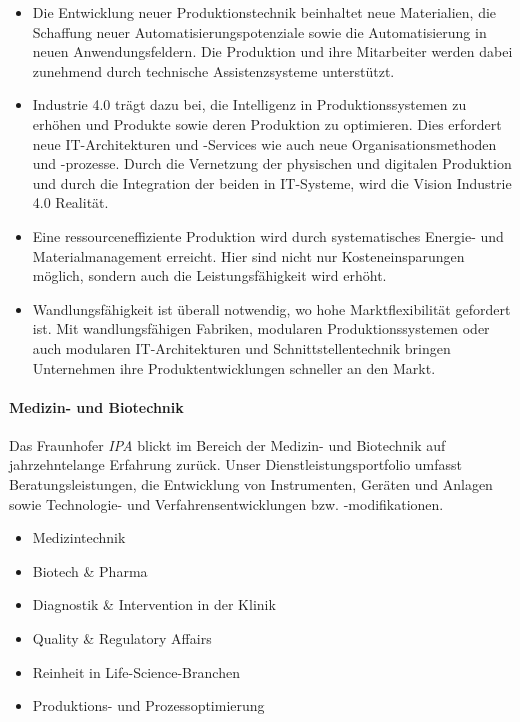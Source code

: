 \begin{itemize}
    \item Die Entwicklung neuer Produktionstechnik beinhaltet neue Materialien, die Schaffung neuer Automatisierungspotenziale sowie die Automatisierung in neuen Anwendungsfeldern.
      Die Produktion und ihre Mitarbeiter werden dabei zunehmend durch technische Assistenzsysteme unterstützt.
    \item Industrie 4.0 trägt dazu bei, die Intelligenz in Produktionssystemen zu erhöhen und Produkte sowie deren Produktion zu optimieren.
      Dies erfordert neue IT-Architekturen und -Services wie auch neue Organisationsmethoden und -prozesse.  Durch die Vernetzung der physischen
      und digitalen Produktion und durch die Integration der beiden in IT-Systeme, wird die Vision Industrie 4.0 Realität.
    \item Eine ressourceneffiziente Produktion wird durch systematisches Energie- und Materialmanagement erreicht. Hier sind nicht nur Kosteneinsparungen möglich,
          sondern auch die Leistungsfähigkeit wird erhöht.
    \item Wandlungsfähigkeit ist überall notwendig, wo hohe Marktflexibilität gefordert ist. Mit wandlungsfähigen Fabriken, modularen Produktionssystemen oder auch modularen IT-Architekturen
      und Schnittstellentechnik bringen Unternehmen ihre Produktentwicklungen schneller an den Markt.
\end{itemize}

\paragraph{Medizin- und Biotechnik}
Das Fraunhofer \emph{IPA} blickt im Bereich der Medizin- und Biotechnik auf jahrzehntelange Erfahrung zurück. Unser Dienstleistungsportfolio umfasst Beratungsleistungen, die Entwicklung von Instrumenten,
Geräten und Anlagen sowie Technologie- und Verfahrensentwicklungen bzw. -modifikationen.
\begin{itemize}
    \item Medizintechnik
    \item Biotech \& Pharma
    \item Diagnostik \& Intervention in der Klinik
    \item Quality \& Regulatory Affairs
    \item Reinheit in Life-Science-Branchen
    \item Produktions- und Prozessoptimierung
\end{itemize}

